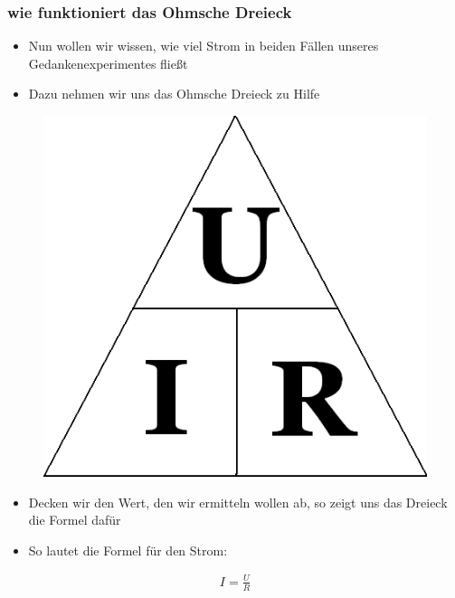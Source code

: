 \begin{frame}
  \frametitle{wie funktioniert das Ohmsche Dreieck}
  \begin{itemize}
    \item Nun wollen wir wissen, wie viel Strom in beiden Fällen unseres Gedankenexperimentes fließt
    \item Dazu nehmen wir uns das Ohmsche Dreieck zu Hilfe
  \end{itemize}
  \begin{center}
    \begin{figure}
      \includegraphics[width=\textwidth,height=.2\textheight,keepaspectratio]{e03/Ohm_law_triangle.png}
    \end{figure}
  \end{center}
  \begin{itemize}
    \item Decken wir den Wert, den wir ermitteln wollen ab, so zeigt uns das Dreieck die Formel dafür
    \item So lautet die Formel für den Strom:
  \end{itemize}
  \begin{align}
    I = \frac{U}{R}
    \label{equ:Strom}
  \end{align}
\end{frame}

